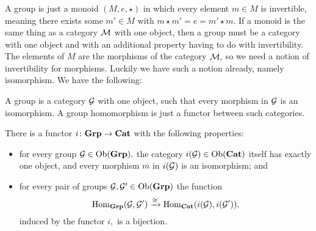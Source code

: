 \documentclass[../main/CT4S-EN-RU]{subfiles}
\begin{document}
\begin{blockRUS}
\end{blockRUS}



\subsubsection{}

\begin{blockENG}
A group is just a monoid $(M,e,\star)$ in which every element $m\in M$ is invertible, meaning there exists some $m'\in M$ with $m\star m'=e=m'\star m.$ If a monoid is the same thing as a category $\mathcal{M}$ with one object, then a group must be a category with one object and with an additional property having to do with invertibility. The elements of $M$ are the morphisms of the category $\mathcal{M},$ so we need a notion of invertibility for morphisms. Luckily we have such a notion already, namely isomorphism. We have the following:
\end{blockENG}

\begin{blockRUS}
\end{blockRUS}

\begin{sloganENG}
A group is a category $\mathcal{G}$ with one object, such that every morphism in $\mathcal{G}$ is an isomorphism. A group homomorphism is just a functor between such categories.
\end{sloganENG}

\begin{sloganRUS}
\end{sloganRUS}

\begin{theoremENG}\label{thm:grp to cat}
There is a functor $i\colon{\mathbf{Grp}}\rightarrow{\mathbf{Cat}}$ with the following properties:
\begin{itemize}
\item for every group $\mathcal{G}\in\operatorname{Ob}({\mathbf{Grp}}),$ the category $i(\mathcal{G})\in\operatorname{Ob}({\mathbf{Cat}})$ itself has exactly one object, and every morphism $m$ in $i(\mathcal{G})$ is an isomorphism; and 
\item for every pair of groups $\mathcal{G},\mathcal{G}'\in\operatorname{Ob}({\mathbf{Grp}})$ the function $$\operatorname{Hom}_{\mathbf{Grp}}(\mathcal{G},\mathcal{G}')\xrightarrow{\cong}\operatorname{Hom}_{\mathbf{Cat}}(i(\mathcal{G}),i(\mathcal{G}')),$$ induced by the functor $i,$ is a bijection.
\end{itemize}
\end{theoremENG}
\end{document}
